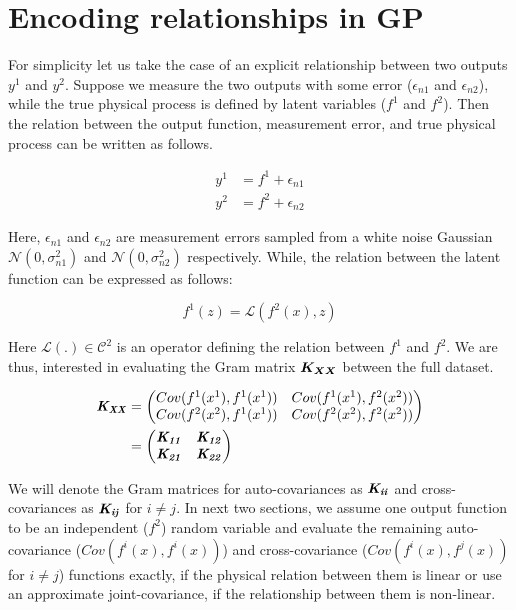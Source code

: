 \section{Encoding relationships in GP}\label{secEncodingRelationships}
For simplicity let us take the case of an explicit relationship between two outputs \(y^{1}\) and \(y^{2}\). Suppose we measure the two outputs with some error ($\epsilon_{n1}$ and $\epsilon_{n2}$), while the true physical process is defined by latent variables (\(f^{1}\) and \(f^{2}\)). Then the relation between the output function, measurement error, and true physical process can be written as follows. 

\begin{align} \label{eq:relationOutputLatentCh7}
y^{1} & = f^{1} + \epsilon_{n1} \\
y^{2} & = f^{2} + \epsilon_{n2}
\end{align} 

Here, \(\epsilon_{n1}\) and \(\epsilon_{n2}\) are measurement errors sampled from a white noise Gaussian \(\mathcal{N}(0, \sigma_{n1}^2)\) and \(\mathcal{N}(0, \sigma_{n2}^2)\) respectively. While, the relation between the latent function can be expressed as follows:

\begin{equation}\label{eq:physicalRelation}
    f^{1}(z) = \mathcal{L}\left ( f^{2}(x), z \right )
\end{equation}

Here \(\mathcal{L} \left ( . \right ) \in \mathcal{C}^{2}\) is an operator defining the relation between \(f^{1}\) and \(f^{2}\). We are thus, interested in evaluating the Gram matrix $\boldsymbol{K_{XX}}$ between the full dataset. 

\begin{align}\label{eq:exactJointCovariance}
      \bm{\mathit{K_{XX}}} & =  \begin{pmatrix}
    Cov(f^1(x^{1}), f^1(x^{1}))  & Cov(f^1(x^{1}), f^2(x^{2}))\\ 
    Cov(f^2(x^{2}), f^1(x^{1}))     & Cov(f^2(x^{2}), f^2(x^{2}))
   \end{pmatrix} \\
   & = \begin{pmatrix}
    \bm{\mathit{K_{11}}}  & \bm{\mathit{K_{12}}}\\ 
    \bm{\mathit{K_{21}}}    & \bm{\mathit{K_{22}}}
   \end{pmatrix}
\end{align}

We will denote the Gram matrices for auto-covariances as $\bm{\mathit{K_{ii}}}$ and cross-covariances as $\bm{\mathit{K_{ij}}}$ for $i \neq j$. In next two sections, we assume one output function to be an independent ($f^2$) random variable and evaluate the remaining auto-covariance ($Cov(f^i(x), f^i(x))$) and cross-covariance ($Cov(f^i(x), f^j(x))$ for $i \neq j$) functions exactly, if the physical relation between them is linear or use an approximate joint-covariance, if the relationship between them is non-linear\cite{Constantinescu2013}.

